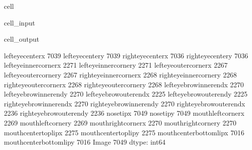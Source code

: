 \documentclass[letterpaper,10pt,english]{jupyterBook}
\begin{document}
\begin{sphinxuseclass}{cell}\begin{sphinxVerbatimInput}

\begin{sphinxuseclass}{cell_input}
\begin{sphinxVerbatim}[commandchars=\\\{\}]
\end{sphinxVerbatim}

\end{sphinxuseclass}\end{sphinxVerbatimInput}
\begin{sphinxVerbatimOutput}

\begin{sphinxuseclass}{cell_output}
\begin{sphinxVerbatim}[commandchars=\\\{\}]
left\PYGZus{}eye\PYGZus{}center\PYGZus{}x            7039
left\PYGZus{}eye\PYGZus{}center\PYGZus{}y            7039
right\PYGZus{}eye\PYGZus{}center\PYGZus{}x           7036
right\PYGZus{}eye\PYGZus{}center\PYGZus{}y           7036
left\PYGZus{}eye\PYGZus{}inner\PYGZus{}corner\PYGZus{}x      2271
left\PYGZus{}eye\PYGZus{}inner\PYGZus{}corner\PYGZus{}y      2271
left\PYGZus{}eye\PYGZus{}outer\PYGZus{}corner\PYGZus{}x      2267
left\PYGZus{}eye\PYGZus{}outer\PYGZus{}corner\PYGZus{}y      2267
right\PYGZus{}eye\PYGZus{}inner\PYGZus{}corner\PYGZus{}x     2268
right\PYGZus{}eye\PYGZus{}inner\PYGZus{}corner\PYGZus{}y     2268
right\PYGZus{}eye\PYGZus{}outer\PYGZus{}corner\PYGZus{}x     2268
right\PYGZus{}eye\PYGZus{}outer\PYGZus{}corner\PYGZus{}y     2268
left\PYGZus{}eyebrow\PYGZus{}inner\PYGZus{}end\PYGZus{}x     2270
left\PYGZus{}eyebrow\PYGZus{}inner\PYGZus{}end\PYGZus{}y     2270
left\PYGZus{}eyebrow\PYGZus{}outer\PYGZus{}end\PYGZus{}x     2225
left\PYGZus{}eyebrow\PYGZus{}outer\PYGZus{}end\PYGZus{}y     2225
right\PYGZus{}eyebrow\PYGZus{}inner\PYGZus{}end\PYGZus{}x    2270
right\PYGZus{}eyebrow\PYGZus{}inner\PYGZus{}end\PYGZus{}y    2270
right\PYGZus{}eyebrow\PYGZus{}outer\PYGZus{}end\PYGZus{}x    2236
right\PYGZus{}eyebrow\PYGZus{}outer\PYGZus{}end\PYGZus{}y    2236
nose\PYGZus{}tip\PYGZus{}x                   7049
nose\PYGZus{}tip\PYGZus{}y                   7049
mouth\PYGZus{}left\PYGZus{}corner\PYGZus{}x          2269
mouth\PYGZus{}left\PYGZus{}corner\PYGZus{}y          2269
mouth\PYGZus{}right\PYGZus{}corner\PYGZus{}x         2270
mouth\PYGZus{}right\PYGZus{}corner\PYGZus{}y         2270
mouth\PYGZus{}center\PYGZus{}top\PYGZus{}lip\PYGZus{}x       2275
mouth\PYGZus{}center\PYGZus{}top\PYGZus{}lip\PYGZus{}y       2275
mouth\PYGZus{}center\PYGZus{}bottom\PYGZus{}lip\PYGZus{}x    7016
mouth\PYGZus{}center\PYGZus{}bottom\PYGZus{}lip\PYGZus{}y    7016
Image                        7049
dtype: int64
\end{sphinxVerbatim}

\end{sphinxuseclass}\end{sphinxVerbatimOutput}

\end{sphinxuseclass}
\end{document}
